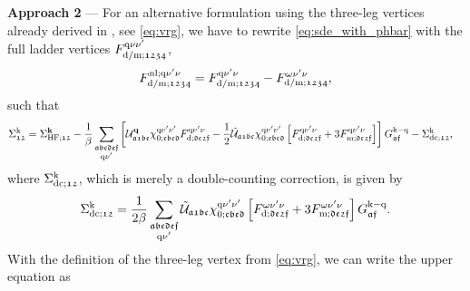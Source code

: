 \documentclass[../../main.tex]{subfiles}
\begin{document}
\\\\
\textbf{Approach 2} --- For an alternative formulation using the three-leg vertices already derived in , see \eqref{eq:vrg}, we have to rewrite \eqref{eq:sde_with_phbar} with the full ladder vertices $F^{\text{q}\nu\nu'}_{\text{d}/\text{m};\mathfrak{1234}}$,
\begin{align}
	F^{\text{nl};\text{q}\nu'\nu}_{\text{d}/\text{m};\mathfrak{1234}}=F^{\text{q}\nu'\nu}_{\text{d}/\text{m};\mathfrak{1234}}-F^{\omega\nu'\nu}_{\text{d}/\text{m};\mathfrak{1234}},
\end{align}
such that
\begin{align}
	\Sigma^{\text{k}}_{\mathfrak{12}}&=\Sigma_{\text{HF};\mathfrak{12}}^{\textbf{k}} -\frac1\beta\sum_{\substack{\mathfrak{abcdef}\\\text{q}\nu'}}\left [\mathcal{U}^{\textbf{q}}_{\mathfrak{a1bc}}\chi^{\text{q}\nu'\nu'}_{0;\mathfrak{cbed}} F^{\text{q}\nu'\nu}_{\text{d};\mathfrak{de2f}}-\frac12\tilde{\mathcal{U}}_{\mathfrak{a1bc}}\chi^{\text{q}\nu'\nu'}_{0;\mathfrak{cbed}}\left [F^{\text{q}\nu'\nu}_{\text{d};\mathfrak{de2f}}+3 F^{\text{q}\nu'\nu}_{\text{m};\mathfrak{de2f}}\right ]\right ]G_{\mathfrak{af}}^{\text{k}-\text{q}} - \Sigma^{\text{k}}_{\text{dc};\mathfrak{12}},
\end{align}
where $\Sigma^{\text{k}}_{\text{dc};\mathfrak{12}}$, which is merely a double-counting correction, is given by
\begin{align}
	\Sigma^{\text{k}}_{\text{dc};\mathfrak{12}} = \frac{1}{2\beta}\sum_{\substack{\mathfrak{abcdef}\\\text{q}\nu'}}\tilde{\mathcal{U}}_{\mathfrak{a1bc}}\chi^{\text{q}\nu'\nu'}_{0;\mathfrak{cbed}}\left [F^{\omega\nu'\nu}_{\text{d};\mathfrak{de2f}}+3 F^{\omega\nu'\nu}_{\text{m};\mathfrak{de2f}}\right ]G_{\mathfrak{af}}^{\text{k}-\text{q}}.
\end{align}
With the definition of the three-leg vertex from \eqref{eq:vrg}, we can write the upper equation as
\end{document}
